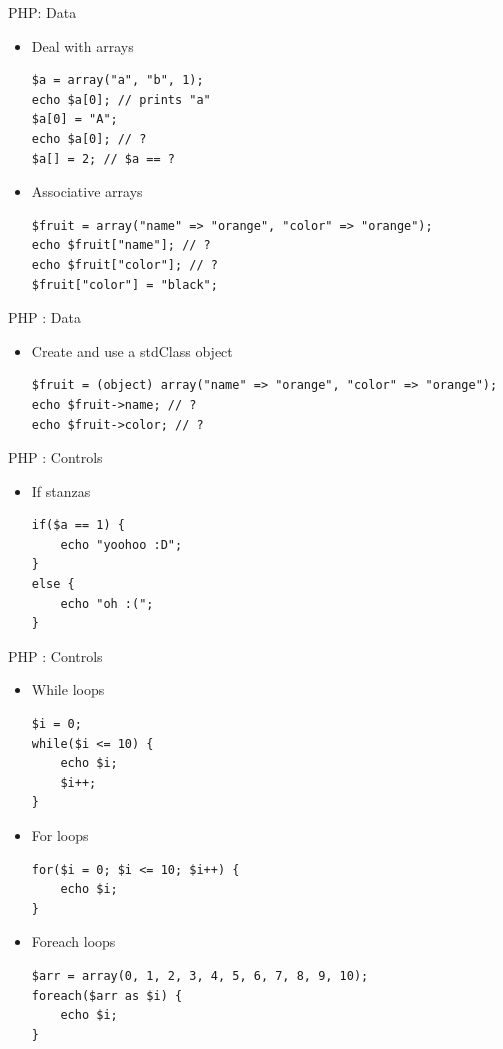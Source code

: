 \documentclass{beamer}
\begin{document}
\begin{frame}[fragile]{PHP: Data}
    \begin{itemize}
        \item Deal with arrays
        \begin{lstlisting}
$a = array("a", "b", 1);
echo $a[0]; // prints "a"
$a[0] = "A";
echo $a[0]; // ?
$a[] = 2; // $a == ?
        \end{lstlisting}
        \item Associative arrays
        \begin{lstlisting}
$fruit = array("name" => "orange", "color" => "orange");
echo $fruit["name"]; // ?
echo $fruit["color"]; // ?
$fruit["color"] = "black";
        \end{lstlisting}
    \end{itemize}
\end{frame}

\begin{frame}[fragile]{PHP : Data}
    \begin{itemize}
        \item Create and use a stdClass object
        \begin{lstlisting}
$fruit = (object) array("name" => "orange", "color" => "orange");
echo $fruit->name; // ?
echo $fruit->color; // ?
        \end{lstlisting}
    \end{itemize}
\end{frame}

\begin{frame}[fragile]{PHP : Controls}
    \begin{itemize}
        \item If stanzas
        \begin{lstlisting}
if($a == 1) {
    echo "yoohoo :D";
}
else {
    echo "oh :(";
}

        \end{lstlisting}
    \end{itemize}
\end{frame}

\begin{frame}[fragile]{PHP : Controls}
    \begin{itemize}
        \item While loops
        \begin{lstlisting}
$i = 0;
while($i <= 10) {
    echo $i;
    $i++;
}
        \end{lstlisting}
        \item For loops
        \begin{lstlisting}
for($i = 0; $i <= 10; $i++) {
    echo $i;
}
        \end{lstlisting}
        \item Foreach loops
        \begin{lstlisting}
$arr = array(0, 1, 2, 3, 4, 5, 6, 7, 8, 9, 10);
foreach($arr as $i) {
    echo $i;
}
        \end{lstlisting}
    \end{itemize}
\end{frame}
\end{document}

